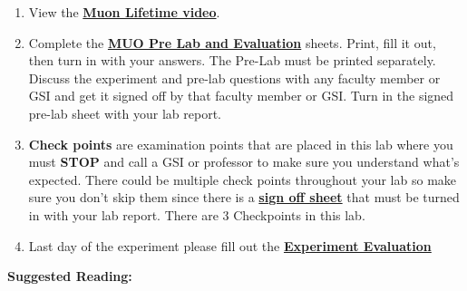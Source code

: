 \documentclass{../lab}
\begin{document}
\begin{enumerate}
    \item View the \href{http://youtu.be/uqH0qRIwBmg}{\textbf{Muon Lifetime video}}.

    \item Complete the \href{http://experimentationlab.berkeley.edu/MUOPreLab}{\textbf{MUO Pre Lab and Evaluation}} sheets. Print, fill it out, then turn in with your answers. The Pre-Lab must be printed separately. Discuss the experiment and pre-lab questions with any faculty member or GSI and get it signed off by that faculty member or GSI. Turn in the signed pre-lab sheet with your lab report.

    \item \textbf{Check points} are examination points that are placed in this lab where you must \textbf{STOP} and call a GSI or professor to make sure you understand what's expected. There could  be multiple check points throughout your lab so make sure you don't skip them since there is a \href{http://experimentationlab.berkeley.edu/muocheckpoints}{\textbf{\textbf{sign off sheet}}} that must be turned in with your lab report. There are 3 Checkpoints in this lab.

    \item Last day of the experiment please fill out the \href{\ExperimentEvaluation}{\textbf{Experiment Evaluation}}

\end{enumerate}

\noindent\textbf{Suggested Reading:}
\end{document}
